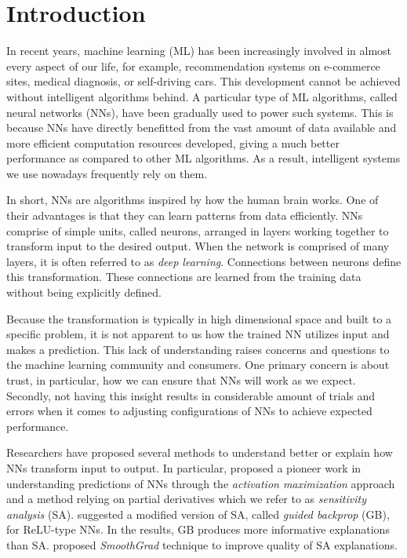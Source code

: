 \chapter{Introduction}
\label{cha:chapter1}
In recent years, machine learning (ML) has been increasingly involved in almost every aspect of our life, for example, recommendation systems on e-commerce sites, medical diagnosis, or self-driving cars. This development cannot be achieved without intelligent algorithms behind. A particular type of ML algorithms, called neural networks (NNs), have been gradually used to power such systems.  This is because NNs have directly benefitted from the vast amount of data available and more efficient computation resources developed, giving a much better performance as compared to other ML algorithms. As a result, intelligent systems we use nowadays frequently rely on them.

In short, NNs are algorithms inspired by how the human brain works. One of their advantages is that they can learn patterns from data efficiently. NNs comprise of simple units, called neurons, arranged in layers working together to transform input to the desired output. When the network is comprised of many layers, it is often referred to as \textit{deep learning}. Connections between neurons define this transformation. These connections are learned from the training data without being explicitly defined. 

Because the transformation is typically in high dimensional space and built to a specific problem, it is not apparent to us how the trained NN utilizes input and makes a prediction.  This lack of understanding raises concerns and questions to the machine learning community and consumers. One primary concern is about trust, in particular, how we can ensure that NNs will work as we expect. Secondly, not having this insight results in considerable amount of trials and errors when it comes to adjusting configurations of NNs to achieve expected performance.

Researchers have proposed several methods to understand better or explain how NNs transform input to output. In particular, \citet{SimonyanDeepConvolutionalNetworks2013}  proposed a pioneer work in understanding predictions of NNs through the \textit{activation maximization} approach and a method relying on partial derivatives which we refer to as \textit{sensitivity analysis} (SA). \citet{SpringenbergStrivingSimplicityAll2015a} suggested a modified version of SA, called \textit{guided backprop} (GB), for ReLU-type NNs. In the results, GB produces more informative explanations than SA. \citet{SmilkovSmoothGradremovingnoise2017}  proposed \textit{SmoothGrad} technique to improve quality of SA explanations. 

